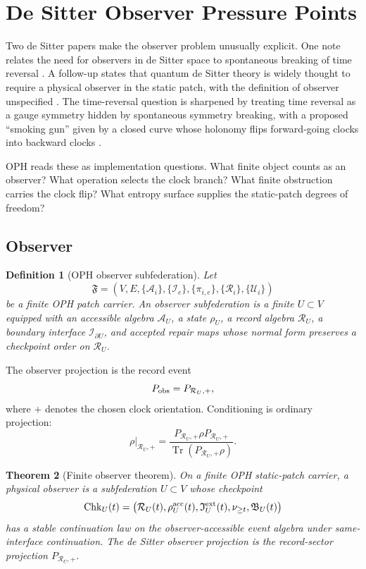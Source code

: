\documentclass[11pt]{article}
\newtheorem{theorem}{Theorem}[section]
\newtheorem{definition}[theorem]{Definition}
\theoremstyle{remark}
\theoremstyle{plain}
\newcommand{\Tr}{\operatorname{Tr}}
\newcommand{\calA}{\mathcal A}
\newcommand{\calR}{\mathcal R}
\newcommand{\calI}{\mathcal I}
\newcommand{\calU}{\mathcal U}
\begin{document}
\section{De Sitter Observer Pressure Points}

Two de Sitter papers make the observer problem unusually explicit. One note relates the need
for observers in de Sitter space to spontaneous breaking of time reversal \cite{DSObservers2025}.
A follow-up states that quantum de Sitter theory is widely thought to require a physical observer
in the static patch, with the definition of observer unspecified \cite{DSMoreObservers2026}. The
time-reversal question is sharpened by treating time reversal as a gauge symmetry hidden by
spontaneous symmetry breaking, with a proposed ``smoking gun'' given by a closed curve whose
holonomy flips forward-going clocks into backward clocks \cite{DSTimeReversal2026}.

OPH reads these as implementation questions. What finite object counts as an observer? What
operation selects the clock branch? What finite obstruction carries the clock flip? What entropy
surface supplies the static-patch degrees of freedom?

\subsection{Observer}

\begin{definition}[OPH observer subfederation]
Let
\[
\mathfrak F=(V,E,\{\calA_i\},\{\calI_e\},\{\pi_{i,e}\},\{\calR_i\},\{\calU_i\})
\]
be a finite OPH patch carrier. An observer subfederation is a finite
\(U\subset V\) equipped with an accessible algebra \(\calA_U\), a state \(\rho_U\), a record
algebra \(\calR_U\), a boundary interface \(\calI_{\partial U}\), and accepted repair maps whose
normal form preserves a checkpoint order on \(\calR_U\).
\end{definition}

The observer projection is the record event
\[
P_{\rm obs}=P_{\calR_U,+},
\]
where \(+\) denotes the chosen clock orientation. Conditioning is ordinary projection:
\[
\rho|_{\calR_U,+}
=
\frac{P_{\calR_U,+}\rho P_{\calR_U,+}}{\Tr(P_{\calR_U,+}\rho)}.
\]

\begin{theorem}[Finite observer theorem]
On a finite OPH static-patch carrier, a physical observer is a subfederation \(U\subset V\) whose
checkpoint
\[
\mathrm{Chk}_U(t)=
\bigl(\calR_U(t),\rho_U^{\rm acc}(t),\mathfrak I_U^{\rm ext}(t),
\nu_{\ge t},\mathfrak B_U(t)\bigr)
\]
has a stable continuation law on the observer-accessible event algebra under same-interface
continuation. The de Sitter observer projection is the record-sector projection
\(P_{\calR_U,+}\).
\end{theorem}
\end{document}
